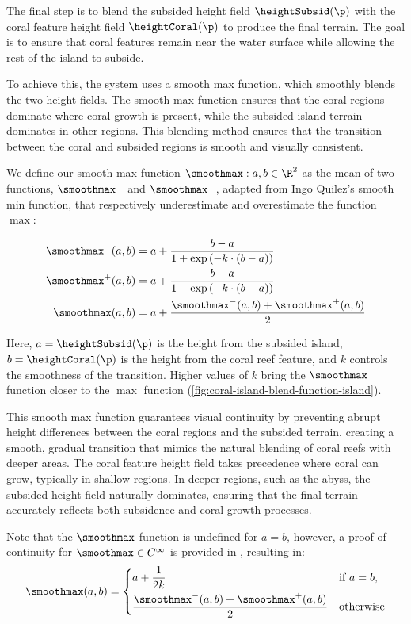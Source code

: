 The final step is to blend the subsided height field $\heightSubsid(\p)$ with the coral feature height field $\heightCoral(\p)$ to produce the final terrain. The goal is to ensure that coral features remain near the water surface while allowing the rest of the island to subside.

To achieve this, the system uses a smooth max function, which smoothly blends the two height fields. The smooth max function ensures that the coral regions dominate where coral growth is present, while the subsided island terrain dominates in other regions. This blending method ensures that the transition between the coral and subsided regions is smooth and visually consistent.

We define our smooth max function $\smoothmax: a, b \in \R^2$ as the mean of two functions, $\smoothmax^-$ and $\smoothmax^+$, adapted from Ingo Quilez's smooth min function, that respectively underestimate and overestimate the function $\max$:

\begin{align}
\smoothmax^-(a, b) &= a + \frac{b - a}{1 + \exp\left(-k \cdot (b - a) \right)} \\
\smoothmax^+(a, b) &= a + \frac{b - a}{1 - \exp\left(-k \cdot (b - a) \right)} \\
\smoothmax(a, b) &= a + \frac{\smoothmax^-(a, b) + \smoothmax^+(a, b)}{2}
\end{align}

Here, $a = \heightSubsid(\p)$ is the height from the subsided island, $b = \heightCoral(\p)$ is the height from the coral reef feature, and $k$ controls the smoothness of the transition. Higher values of $k$ bring the $\smoothmax$ function closer to the $\max$ function (\cref{fig:coral-island-blend-function-island}).

This smooth max function guarantees visual continuity by preventing abrupt height differences between the coral regions and the subsided terrain, creating a smooth, gradual transition that mimics the natural blending of coral reefs with deeper areas. The coral feature height field takes precedence where coral can grow, typically in shallow regions. In deeper regions, such as the abyss, the subsided height field naturally dominates, ensuring that the final terrain accurately reflects both subsidence and coral growth processes.

Note that the $\smoothmax$ function is undefined for $a = b$, however, a proof of continuity for $\smoothmax \in C^\infty$ is provided in , resulting in:
\begin{align}
    \label{eq:coral-island-smoothmax-function}
    \smoothmax(a, b) = \begin{dcases}
        a + \frac{1}{2k} & \text{if } a = b, \\
        \frac{\smoothmax^-(a, b) + \smoothmax^+(a, b)}{2} & \text{otherwise}
    \end{dcases}
\end{align}

